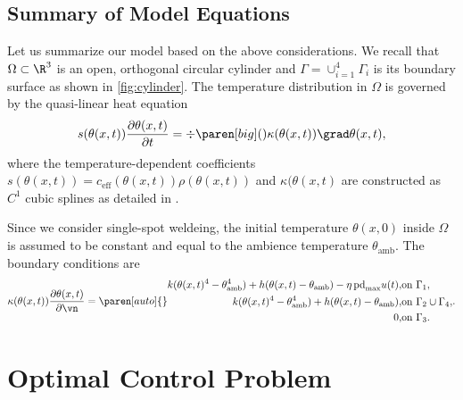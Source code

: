 \subsection{Summary of Model Equations}
\label{subsec:equations}


Let us summarize our model based on the above considerations.
We recall that $\Omega\subset \R^3$ is an open, orthogonal circular cylinder and $\Gamma = \cup_{i=1}^4 \Gamma_i$ is its boundary surface as shown in \cref{fig:cylinder}. 
The temperature distribution in $\Omega$ is governed by the quasi-linear heat equation
\begin{equation} \label{eq:heat_eq}
	s(\theta(x,t)) \frac{\partial \theta(x,t)}{\partial t} 
	= 
	\div \paren[big](){\kappa(\theta(x,t)) \grad\theta(x,t)}
	,
\end{equation}
where the temperature-dependent coefficients $s(\theta(x,t)) = c_\text{eff}(\theta(x,t)) \rho(\theta(x,t))$ and $\kappa(\theta(x,t)$ are constructed as $C^1$ cubic splines as detailed in \cite[\texttt{optipuls.coefficients}]{optipuls_github}.

Since we consider single-spot weldeing, the initial temperature $\theta(x,0)$ inside $\Omega$ is assumed to be constant and equal to the ambience temperature $\theta_\text{amb}$.
The boundary conditions are
\begin{equation} \label{eq:heat_eq_bc}
	\kappa(\theta(x,t)) \frac{\partial \theta(x,t)}{\partial \vn} 
	= 
	\paren[auto]\{\}{%
		\begin{aligned}
			k (\theta(x,t)^4 - \theta_\text{amb}^4) + h (\theta(x,t) - \theta_\text{amb}) - \eta\, \text{pd}_{\max} u(t)
			, 
			& 
			\text{on } \Gamma_1
			, 
			\\
			k (\theta(x,t)^4 - \theta_\text{amb}^4) + h (\theta(x,t) - \theta_\text{amb})
			, 
			& 
			\text{on } \Gamma_2 \cup \Gamma_4
			, 
			\\
			0
			, 
			& 
			\text{on } \Gamma_3
			.
		\end{aligned}
	}
	.
\end{equation}

\section{Optimal Control Problem}
\label{sec:optimal_control_problem}

